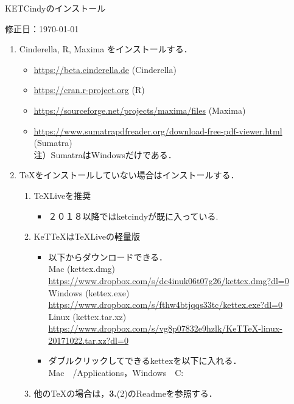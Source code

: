 \documentclass{ujarticle}
\begin{document}
\begin{center}
KETCindyのインストール
\end{center}

\hfill 修正日：\today

\begin{enumerate}[\bf\large 1.]
\item Cinderella, R, Maxima をインストールする．
 \begin{itemize}
 \item \url{https://beta.cinderella.de}  (Cinderella)
 \item \url{https://cran.r-project.org}   (R)
 \item \url{https://sourceforge.net/projects/maxima/files}  (Maxima)
 \item \url{https://www.sumatrapdfreader.org/download-free-pdf-viewer.html} (Sumatra)\\
 \hspace*{10mm}注）SumatraはWindowsだけである．
 \end{itemize}
\item TeXをインストールしていない場合はインストールする．
 \begin{enumerate}[(1)]
 \item TeXLiveを推奨
    \begin{itemize}
    \item ２０１８以降ではketcindyが既に入っている.
    \end{itemize}
 \item KeTTeXはTeXLiveの軽量版
    \begin{itemize}
    \item 以下からダウンロードできる．\\
    \hspace*{5mm}Mac (kettex.dmg)\\
    \hspace*{10mm}\url{https://www.dropbox.com/s/dc4inuk06t07g26/kettex.dmg?dl=0}\\
    \hspace*{5mm}Windows (kettex.exe)\\
    \hspace*{10mm}\url{https://www.dropbox.com/s/fthw4btjqqs33tc/kettex.exe?dl=0}\\
    \hspace*{5mm}Linux (kettex.tar.xz)\\
    \hspace*{10mm}\url{https://www.dropbox.com/s/vg8p07832e9hzlk/KeTTeX-linux-20171022.tar.xz?dl=0}
     \item ダブルクリックしてできるkettexを以下に入れる．\\
     \hspace*{10mm}Mac\ \ /Applications，Windows\ \ C:\
    \end{itemize}
 \item 他のTeXの場合は，{\bf 3.}(2)のReadmeを参照する．
 \end{enumerate}


\end{enumerate}
\end{document}
